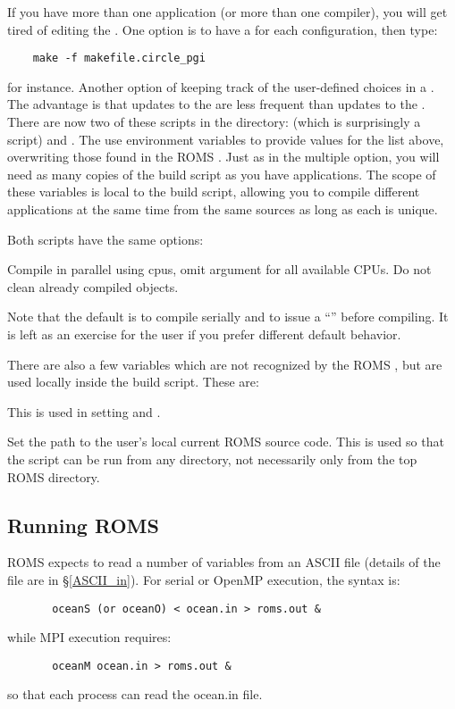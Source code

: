 If you have more than one application (or more than one compiler),
you will get tired of editing the .
One option is to have a  for each configuration, then
type:
\begin{verbatim}
    make -f makefile.circle_pgi
\end{verbatim}
for instance. Another option of keeping track of the user-defined
choices in a . The advantage is that updates
to the  are less frequent than updates to the
. There are now two of these scripts in the 
directory:  (which is surprisingly a  script)
and .  The  use environment variables
to provide values for the list above, overwriting those found in the ROMS
. Just as in the multiple  option, you will
need as many copies of the build script as you have applications. The
scope of these variables is local to the build script, allowing you to
compile different applications at the same time from the same sources
as long as each  is unique.

Both scripts have the same options:
\begin{klist}
   Compile in parallel using  cpus,
  omit argument for all available CPUs.
      Do not clean already compiled objects.
\end{klist}
Note that the default is to compile serially and to issue a
``'' before compiling. It is left as an exercise
for the user if you prefer different default behavior.

There are also a few variables which are not recognized by the ROMS
, but are used locally inside the build script. These
are:
\begin{klist}
 This is used in setting
 and .

 Set the path to the user's local current ROMS source
code. This is used so that the script can be run from any directory,
not necessarily only from the top ROMS directory.
\end{klist}

\subsection{Running ROMS}
\label{Running}
ROMS expects to read a number of variables from an ASCII file
(details of the file are in \S\ref{ASCII_in}).
For serial or OpenMP execution, the syntax is:
\begin{verbatim}
       oceanS (or oceanO) < ocean.in > roms.out &
\end{verbatim}
while MPI execution requires:
\begin{verbatim}
       oceanM ocean.in > roms.out &
\end{verbatim}
so that each process can read the ocean.in file.

